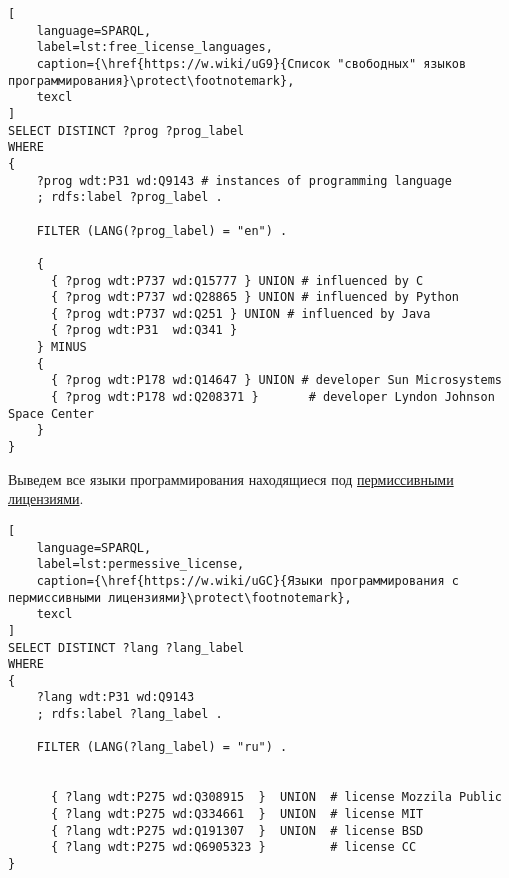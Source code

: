 \begin{lstlisting}[
	language=SPARQL,
	label=lst:free_license_languages,
	caption={\href{https://w.wiki/uG9}{Список "свободных" языков программирования}\protect\footnotemark},
	texcl
]
SELECT DISTINCT ?prog ?prog_label
WHERE
{
    ?prog wdt:P31 wd:Q9143 # instances of programming language
    ; rdfs:label ?prog_label . 

    FILTER (LANG(?prog_label) = "en") . 

    {
      { ?prog wdt:P737 wd:Q15777 } UNION # influenced by C
      { ?prog wdt:P737 wd:Q28865 } UNION # influenced by Python
      { ?prog wdt:P737 wd:Q251 } UNION # influenced by Java
      { ?prog wdt:P31  wd:Q341 }
    } MINUS 
  	{ 
      { ?prog wdt:P178 wd:Q14647 } UNION # developer Sun Microsystems
      { ?prog wdt:P178 wd:Q208371 }       # developer Lyndon Johnson Space Center
    }
}
\end{lstlisting}

Выведем все языки программирования находящиеся под \href{https://en.wikipedia.org/wiki/Permissive_software_license}{пермиссивными лицензиями}.
\begin{lstlisting}[
	language=SPARQL,
	label=lst:permessive_license,
	caption={\href{https://w.wiki/uGC}{Языки программирования с пермиссивными лицензиями}\protect\footnotemark},
	texcl
]
SELECT DISTINCT ?lang ?lang_label
WHERE
{
    ?lang wdt:P31 wd:Q9143
    ; rdfs:label ?lang_label . 

    FILTER (LANG(?lang_label) = "ru") . 

     
      { ?lang wdt:P275 wd:Q308915  }  UNION  # license Mozzila Public
      { ?lang wdt:P275 wd:Q334661  }  UNION  # license MIT
	  { ?lang wdt:P275 wd:Q191307  }  UNION  # license BSD
	  { ?lang wdt:P275 wd:Q6905323 }         # license CC
}
\end{lstlisting}


